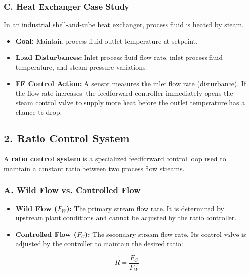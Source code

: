 \subsubsection{C. Heat Exchanger Case Study}
In an industrial shell-and-tube heat exchanger, process fluid is heated by steam.
\begin{itemize}
  \item \textbf{Goal:} Maintain process fluid outlet temperature at setpoint.
  \item \textbf{Load Disturbances:} Inlet process fluid flow rate, inlet process fluid temperature, and steam pressure variations.
  \item \textbf{FF Control Action:} A sensor measures the inlet flow rate (disturbance). If the flow rate increases, the feedforward controller immediately opens the steam control valve to supply more heat before the outlet temperature has a chance to drop.
\end{itemize}


\subsection{2. Ratio Control System}
A \textbf{ratio control system} is a specialized feedforward control loop used to maintain a constant ratio between two process flow streams.

\subsubsection{A. Wild Flow vs. Controlled Flow}
\begin{itemize}
  \item \textbf{Wild Flow ($F_W$):} The primary stream flow rate. It is determined by upstream plant conditions and cannot be adjusted by the ratio controller.
  \item \textbf{Controlled Flow ($F_C$):} The secondary stream flow rate. Its control valve is adjusted by the controller to maintain the desired ratio:
\end{itemize}
  \[ R = \frac{F_C}{F_W} \]

